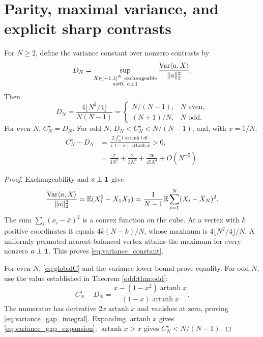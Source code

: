 \section{Parity, maximal variance, and explicit sharp contrasts}\label{sec:parity}
\begin{proposition}\label{prop:variance_parity}
For $N\ge2$, define the variance constant over nonzero contrasts by
\[
 D_N=\sup_{\substack{X\in[-1,1]^N\ \mathrm{exchangeable}\\a\ne0,\ a\perp\one}}
 \frac{\Var\langle a,X\rangle}{\|a\|_2^2}.
\]
Then
\begin{equation}\label{eq:variance_constant}
 D_N=\frac{4\lfloor N^2/4\rfloor}{N(N-1)}
 =\begin{cases}N/(N-1),&N\text{ even},\\(N+1)/N,&N\text{ odd}.
 \end{cases}
\end{equation}
For even $N$, $C_N^\star=D_N$. For odd $N$, $D_N<C_N^\star<N/(N-1)$, and, with $x=1/N$,
\begin{align}
 C_N^\star-D_N
 &=\frac{2\int_0^x t\operatorname{artanh}t\,dt}
 {(1-x)\operatorname{artanh}x}>0,\label{eq:variance_gap_integral}\\
 &=\frac{2}{3N^2}+\frac{2}{3N^3}+\frac{26}{45N^4}+O(N^{-5}).\label{eq:variance_gap_expansion}
\end{align}
\end{proposition}
\begin{proof}
Exchangeability and $a\perp\mathbf1$ give
\[
 \frac{\operatorname{Var}\langle a,X\rangle}{\|a\|_2^2}
 =\mathbb E(X_1^2-X_1X_2)
 =\frac1{N-1}\mathbb E\sum_{i=1}^N(X_i-\bar X_N)^2.
\]
The sum $\sum_i(x_i-\bar x)^2$ is a convex function on the cube. At a vertex with $k$ positive coordinates it equals $4k(N-k)/N$, whose maximum is $4\lfloor N^2/4\rfloor/N$. A uniformly permuted nearest-balanced vertex attains the maximum for every nonzero $a\perp\mathbf1$. This proves \eqref{eq:variance_constant}.

For even $N$, \eqref{eq:globalC} and the variance lower bound prove equality. For odd $N$, use the value established in Theorem \ref{odd:thm:odd}:
\[
 C_N^\star-D_N
 =\frac{x-(1-x^2)\operatorname{artanh}x}
 {(1-x)\operatorname{artanh}x}.
\]
The numerator has derivative $2x\operatorname{artanh}x$ and vanishes at zero, proving \eqref{eq:variance_gap_integral}. Expanding $\operatorname{artanh}x$ gives \eqref{eq:variance_gap_expansion}; $\operatorname{artanh}x>x$ gives $C_N^\star<N/(N-1)$.
\end{proof}

